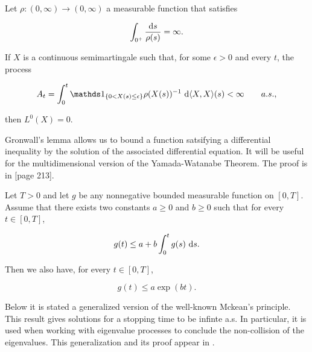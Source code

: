 \begin{theorem} \label{thm:local_zero} 
    Let  $\rho : (0,\infty) \to (0,\infty)$ a measurable function that satisfies 

    \begin{equation*}
        \int_{0^+} \frac{\mathrm d s}{\rho(s)} = \infty.
    \end{equation*}


    If $X$ is a continuous semimartingale such that, for some $\epsilon > 0$ and every $t$, the process

    \begin{equation*}
        A_t = \int_0^t \mathds 1_{\{0 < X(s) \le \epsilon\}} \rho(X(s))^{-1} ~\d \langle X, X \rangle (s) < \infty \qquad a.s.,
    \end{equation*}

    \noindent then $L^0(X) = 0$.
\end{theorem}

Gronwall's lemma allows us to bound a function satsifying a differential inequality by the solution of the associated differential equation. It will be  useful for the multidimensional version of the Yamada-Watanabe Theorem. The proof is in \cite{book:legall}[page 213].


\begin{lemma} 
    \label{lemma:gronwall} %
    Let $T >0$ and let $g$ be any nonnegative bounded measurable function on $[0,T]$. Assume that there exists two constants $a\ge 0$ and $b\ge 0$ such that for every $t\in [0,T]$,

    \[ g(t) \le a + b\int_0^t g(s)~\mathrm d s. \]

    Then we also have, for every $t \in [0,T]$,

    \[ g(t) \le a \exp(bt). \]
\end{lemma}

Below it is stated a generalized version of the well-known Mckean's principle. This result gives solutions for a stopping time to be infinte a.s. In particular, it is used when working with eigenvalue processes to conclude the non-collision of the eigenvalues. This generalization and its proof appear in \cite{mayerhofer2011strong}.

